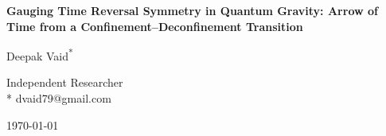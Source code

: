 \documentclass[preprint]{SciPost}
\theoremstyle{plain} %
\begin{document}

\begin{center}{\Large \textbf{
Gauging Time Reversal Symmetry in Quantum Gravity: Arrow of Time from a Confinement--Deconfinement Transition
}}\end{center}

\begin{center}
Deepak Vaid\textsuperscript{*}
\end{center}

\begin{center}
Independent Researcher
\\
* dvaid79@gmail.com
\end{center}

\begin{center}
\today
\end{center}

\end{document}
